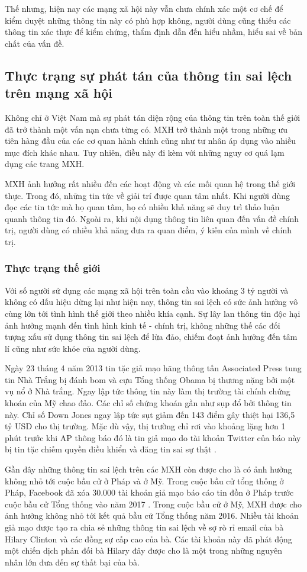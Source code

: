 		Thế nhưng, hiện nay các mạng xã hội này vẫn chưa chính xác một cơ chế để kiểm duyệt những thông tin này có phù hợp không, người dùng cũng thiếu các thông tin xác thực để kiểm chứng, thẩm định dẫn đến hiểu nhầm, hiểu sai về bản chất của vấn đề.
	\subsection{Thực trạng sự phát tán của thông tin sai lệch trên mạng xã hội }
	Không chỉ ở Việt Nam mà sự phát tán diện rộng của thông tin trên toàn thế giới đã trở thành một vấn nạn chưa từng có. MXH trở thành một trong những ưu tiên hàng đầu của các cơ quan hành chính cũng như tư nhân áp dụng vào nhiều mục đích khác nhau. Tuy nhiên, điều này đi kèm với những nguy cơ quá lạm dụng các trang MXH.
	
	MXH ảnh hưởng rất nhiều đến các hoạt động và các mối quan hệ trong thế giới thực. Trong đó, những tin tức về giải trí được quan tâm nhất. Khi người dùng đọc các tin tức mà họ quan tâm, họ có nhiều khả năng sẽ duy trì thảo luận quanh thông tin đó. Ngoài ra, khi nội dụng thông tin liên quan đến vấn đề chính trị, người dùng có nhiều khả năng đưa ra quan điểm, ý kiến của mình về chính trị.
		\subsubsection{Thực trạng thế giới}
		Với số người sử dụng các mạng xã hội trên toàn cầu vào khoảng 3 tỷ người và không có dấu hiệu dừng lại như hiện nay, thông tin sai lệch có sức ảnh hưởng vô cùng lớn tới tình hình thế giới theo nhiều khía cạnh. Sự lây lan thông tin độc hại ảnh hưởng mạnh đến tình hình kinh tế - chính trị, không những thế các đối tượng xấu sử dụng thông tin sai lệch để lừa đảo, chiếm đoạt ảnh hưởng đến tâm lí cũng như sức khỏe của người dùng.
		 
		Ngày 23 tháng 4 năm 2013 tin tặc giả mạo hãng thông tấn Associated Press tung tin Nhà Trắng bị đánh bom và cựu Tổng thống Obama bị thương nặng bởi một vụ  nổ ở Nhà trắng. Ngay lập tức thông tin này làm thị trường tài chính chứng khoán của Mỹ chao đảo. Các chỉ số chứng khoán gần như sụp đổ bởi thông tin này. Chỉ số Down Jones ngay lập tức sụt giảm đến 143 điểm gây thiệt hại 136,5 tỷ USD cho thị trường. Mặc dù vậy, thị trường chỉ rơi vào khoảng lặng hơn 1 phút trước khi AP thông báo đó là tin giả mạo do tài khoản Twitter của báo này bị tin tặc chiếm quyền điều khiển và đăng tin sai sự thật \cite{APhack}.
		
		Gần đây những thông tin sai lệch trên các MXH còn được cho là có ảnh hưởng không nhỏ tới cuộc bầu cử ở Pháp và ở Mỹ. Trong cuộc bầu cử tổng thống ở Pháp, Facebook đã xóa 30.000 tài khoản giả mạo báo cáo tin đồn ở Pháp trước cuộc bầu cử Tổng thống vào năm 2017 \cite{Anhhuong}. Trong cuộc bầu cử ở Mỹ, MXH được cho ảnh hưởng không nhỏ tới kết quả bầu cử Tổng thống năm 2016. Nhiều tài khoản giả mạo được tạo ra chia sẻ những thông tin sai lệch về sợ rò rỉ email của bà Hilary Clinton và các đồng sự cấp cao của bà. Các tài khoản này đã phát động một chiến dịch phản đối bà Hilary đây được cho là một trong những nguyên nhân lớn đưa đến sự thất bại của bà.
		
